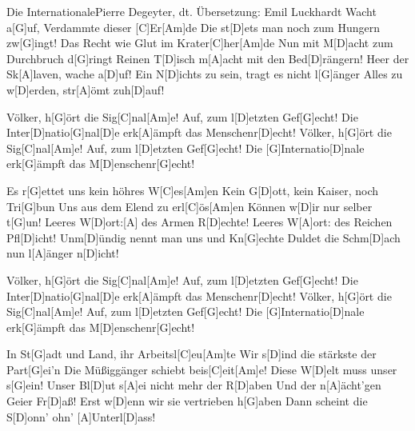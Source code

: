 \documentclass[../main.tex]{subfiles}
\begin{document}
\begin{song}[2]{Die Internationale}{Pierre Degeyter, dt. Übersetzung: Emil Luckhardt}{}
Wacht a[G]uf, Verdammte dieser [C]Er[Am]de
Die st[D]ets man noch zum Hungern zw[G]ingt!
Das Recht wie Glut im Krater[C]her[Am]de
Nun mit M[D]acht zum Durchbruch d[G]ringt
Reinen T[D]isch m[A]acht mit den Bed[D]rängern!
Heer der Sk[A]laven, wache a[D]uf!
Ein N[D]ichts zu sein, tragt es nicht l[G]{ä}nger
Alles zu w[D]erden, str[A]{ö}mt zuh[D]auf!

Völker, h[G]{ö}rt die Sig[C]nal[Am]e! Auf, zum l[D]etzten Gef[G]echt!
Die Inter[D]natio[G]nal[D]e erk[A]{ä}mpft das Menschenr[D]echt!
Völker, h[G]{ö}rt die Sig[C]nal[Am]e! Auf, zum l[D]etzten Gef[G]echt!
Die [G]Internatio[D]nale erk[G]{ä}mpft das M[D]enschenr[G]echt!

Es r[G]ettet uns kein höhres W[C]es[Am]en
Kein G[D]ott, kein Kaiser, noch Tri[G]bun
Uns aus dem Elend zu erl[C]{ö}s[Am]en
Können w[D]ir nur selber t[G]un!
Leeres W[D]ort:[A] des Armen R[D]echte!
Leeres W[A]ort: des Reichen Pfl[D]icht!
Unm[D]{ü}ndig nennt man uns und Kn[G]echte
Duldet die Schm[D]ach nun l[A]{ä}nger n[D]icht!

Völker, h[G]{ö}rt die Sig[C]nal[Am]e! Auf, zum l[D]etzten Gef[G]echt!
Die Inter[D]natio[G]nal[D]e erk[A]{ä}mpft das Menschenr[D]echt!
Völker, h[G]{ö}rt die Sig[C]nal[Am]e! Auf, zum l[D]etzten Gef[G]echt!
Die [G]Internatio[D]nale erk[G]{ä}mpft das M[D]enschenr[G]echt!

In St[G]adt und Land, ihr Arbeitsl[C]eu[Am]te
Wir s[D]ind die stärkste der Part[G]ei'n
Die Müßiggänger schiebt beis[C]eit[Am]e!
Diese W[D]elt muss unser s[G]ein!
Unser Bl[D]ut s[A]ei nicht mehr der R[D]aben
Und der n[A]{ä}cht'gen Geier Fr[D]aß!
Erst w[D]enn wir sie vertrieben h[G]aben
Dann scheint die S[D]onn' ohn' [A]Unterl[D]ass!

\end{song}
\end{document}
